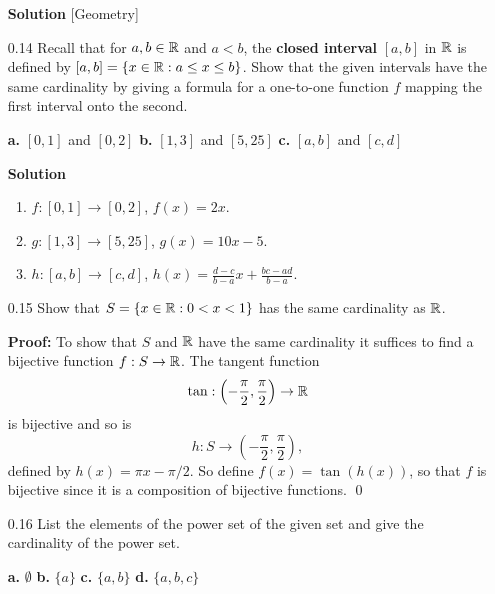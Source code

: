 \begin{enumerate}
      \textbf{Solution} [Geometry]
   \item[0.14] Recall that for $a, b \in \mathbb{R}$ and $a < b$, the \textbf{closed
               interval} $[a, b]$ in $\mathbb{R}$ is defined by
               $[a, b] = \{x \in \mathbb{R} : a \le x \le b\}$. Show that the given
               intervals have the same cardinality by giving a formula for a
               one-to-one function $f$ mapping the first interval onto the
               second.

               \textbf{a.} $[0, 1]$ and $[0, 2]$
               \qquad\qquad\qquad
               \textbf{b.} $[1, 3]$ and $[5, 25]$
               \qquad\qquad\qquad
               \textbf{c.} $[a, b]$ and $[c, d]$

      \textbf{Solution}

      \begin{enumerate}
         \item $f : [0, 1] \rightarrow [0, 2]$, $f(x) = 2x$.
         \item $g : [1, 3] \rightarrow [5, 25]$, $g(x) = 10x - 5$.
         \item $h : [a, b] \rightarrow [c, d]$, $h(x) =
               \displaystyle\frac{d - c}{b - a}x + \frac{bc - ad}{b - a}$.
      \end{enumerate}
   \item[0.15] Show that $S = \{x \in \mathbb{R} : 0 < x < 1\}$ has the same cardinality
               as $\mathbb{R}$.

      \textbf{Proof:} To show that $S$ and $\mathbb{R}$ have the same cardinality it 
      suffices to find a   bijective function $f : S \rightarrow \mathbb{R}$. The
      tangent function
      $$\tan : \left(-\frac{\pi}{2}, \frac{\pi}{2}\right) \rightarrow \mathbb{R}$$
      is bijective and so is
      $$h : S \rightarrow \left(-\frac{\pi}{2}, \frac{\pi}{2}\right),$$
      defined by $h(x) = \pi x - \pi/2$. So define $f(x) = \tan(h(x))$, so that
      $f$ is bijective since it is a composition of bijective functions. \qed
   \item[0.16] List the elements of the power set of the given set and give the
               cardinality of the power set.

               \textbf{a.} $\emptyset$
               \qquad\qquad
               \textbf{b.} $\{a\}$
               \qquad\qquad
               \textbf{c.} $\{a, b\}$
               \qquad\qquad
               \textbf{d.} $\{a, b, c\}$


\end{enumerate}
